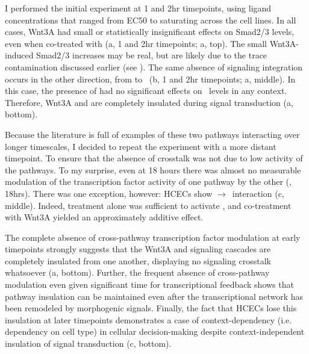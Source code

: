 I performed the initial experiment at 1 and 2hr timepoints, using
ligand concentrations that ranged from EC50 to saturating across
the cell lines. In all cases, Wnt3A had small or
statistically insignificant effects on Smad2/3 levels, even when 
co-treated with  (a,
1 and 2hr timepoints; a, top).
The small Wnt3A-induced Smad2/3 increases may be
real, but are likely due to the trace contamination discussed earlier
(see ). 
The same absence of signaling integration occurs in the other direction,
from  to \bcat\ (b,
1 and 2hr timepoints; a, middle).
In this case, the presence of  had no significant effects
on \bcat\ levels in any context. Therefore, Wnt3A and  
are completely insulated during signal transduction
(a, bottom).


Because the literature is full of examples of these two pathways interacting
over longer timescales, I decided to repeat the experiment with a more distant
timepoint.
To ensure that the absence of crosstalk was not due to low activity of the
pathways.
To my surprise, even at 18 hours there was almost no measurable modulation
of the transcription factor activity of one pathway by the other
(, 18hrs). There was
one exception, however: HCECs show $\rightarrow$\bcat\ interaction
(c, middle). Indeed,
 treatment alone was sufficient to activate \bcat, and co-treatment
with Wnt3A yielded an approximately additive effect.


The complete absence of cross-pathway transcription factor modulation
at early timepoints strongly suggests that the Wnt3A and 
signaling cascades are completely insulated from one another,
displaying no signaling crosstalk whatsoever
(a, bottom). Further,
the frequent absence of cross-pathway modulation even given significant
time for transcriptional feedback shows that pathway insulation can be
maintained even after the transcriptional network has been remodeled by
morphogenic signals. Finally, the fact that HCECs lose this insulation
at later timepoints demonstrates a case of context-dependency
(i.e. dependency on cell type) in cellular decision-making
despite context-independent insulation of signal transduction
(c, bottom).

